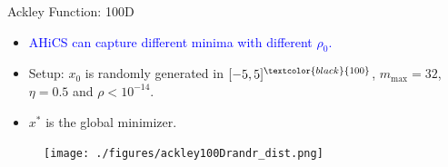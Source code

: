 \documentclass{beamer}
\begin{document}
\begin{frame}{Ackley Function: 100D}
	\begin{itemize}
		\item \textcolor{blue}{AHiCS can capture different minima
			with different $\rho_0$.}
		\item Setup: $x_0$ is randomly generated in
			$[-5,5]^{\textcolor{black}{100}}$, $m_{\max}=32$,
			$\eta=0.5$ and $\rho< 10^{-14}$.
		\item $x^*$ is the global minimizer.
	\end{itemize}

\begin{figure}[!htbp]
	\centering
      \texttt{[image: ./figures/ackley100Drandr\_dist.png]}
\label{fig:obset:sketch}
\end{figure}



\end{frame}
\end{document}
